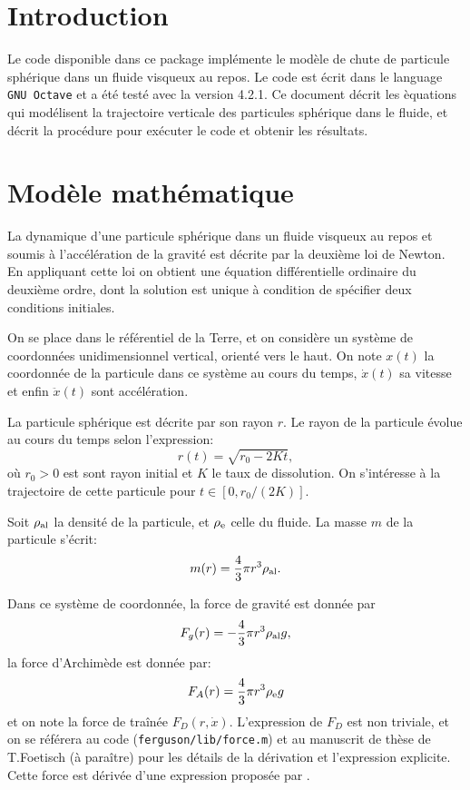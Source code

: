 \section{Introduction}
Le code disponible dans ce package impl\'emente le mod\`ele de chute
de particule sph\'erique dans un fluide visqueux au repos. Le code est
\'ecrit dans le language \texttt{GNU Octave} et a \'et\'e test\'e avec
la version 4.2.1. Ce document d\'ecrit les \`equations qui
mod\'elisent la trajectoire verticale des particules sph\'erique dans
le fluide, et d\'ecrit la proc\'edure pour ex\'ecuter le code et
obtenir les r\'esultats.

\section{Mod\`ele math\'ematique}
La dynamique d'une particule sph\'erique dans un fluide visqueux au
repos et soumis \`a l'acc\'el\'eration de la gravit\'e est d\'ecrite
par la deuxi\`eme loi de Newton. En appliquant cette loi on obtient
une \'equation diff\'erentielle ordinaire du deuxi\`eme ordre, dont la
solution est unique \`a condition de sp\'ecifier deux conditions
initiales.

On se place dans le r\'ef\'erentiel de la Terre, et on consid\`ere un
syst\`eme de coordonn\'ees unidimensionnel vertical, orient\'e vers le
haut. On note $x(t)$ la coordonn\'ee de la particule dans ce syst\`eme
au cours du temps, $\dot x(t)$ sa vitesse et enfin $\ddot x(t)$ sont
acc\'el\'eration.

La particule sph\'erique est d\'ecrite par son rayon $r$. Le rayon de
la particule \'evolue au cours du temps selon l'expression:
\begin{equation}
  r(t) = \sqrt{r_0 - 2 K t},
\end{equation}
o\`u $r_0 > 0$ est sont rayon initial et $K$ le taux de
dissolution. On s'int\'eresse \`a la trajectoire de cette particule
pour $t \in [0, r_0/(2K)]$.

Soit $\rho_\text{al}$ la densit\'e de la particule, et $\rho_\text{e}$ celle du
fluide. La masse $m$ de la particule s'\'ecrit:
\begin{equation}
  m(r) = \frac{4}{3}\pi r^3 \rho_\text{al}.
\end{equation}

Dans ce syst\`eme de coordonn\'ee, la force de gravit\'e est donn\'ee par
\begin{equation}
  F_g(r) = -\frac{4}{3}\pi r^3 \rho_\text{al} g,
\end{equation}
la force d'Archim\`ede est donn\'ee par:
\begin{equation}
  F_A(r) = \frac{4}{3}\pi r^3 \rho_\text{e} g
\end{equation}
et on note la force de tra\^in\'ee $F_D(r, \dot x)$. L'expression de
$F_D$ est non triviale, et on se r\'ef\'erera au code (\texttt{ferguson/lib/force.m}) et au manuscrit
de th\`ese de T.Foetisch (\`a para\^itre) pour les d\'etails de la
d\'erivation et l'expression explicite. Cette force est d\'eriv\'ee
d'une expression propos\'ee par \cite{Ferguson2004}.

